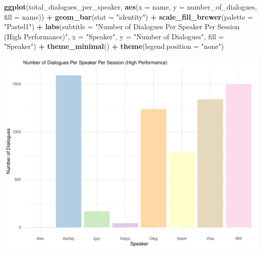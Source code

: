 \documentclass[
]{article}
\newenvironment{Shaded}{\begin{snugshade}}{\end{snugshade}}
\newcommand{\AttributeTok}[1]{\textcolor[rgb]{0.13,0.29,0.53}{#1}}
\newcommand{\FunctionTok}[1]{\textcolor[rgb]{0.13,0.29,0.53}{\textbf{#1}}}
\newcommand{\NormalTok}[1]{#1}
\newcommand{\SpecialCharTok}[1]{\textcolor[rgb]{0.81,0.36,0.00}{\textbf{#1}}}
\newcommand{\StringTok}[1]{\textcolor[rgb]{0.31,0.60,0.02}{#1}}
\begin{document}
\begin{Shaded}
\begin{Highlighting}[]
\FunctionTok{ggplot}\NormalTok{(total\_dialogues\_per\_speaker, }\FunctionTok{aes}\NormalTok{(}\AttributeTok{x =}\NormalTok{ name, }\AttributeTok{y =}\NormalTok{ number\_of\_dialogues, }\AttributeTok{fill =}\NormalTok{ name)) }\SpecialCharTok{+} 
  \FunctionTok{geom\_bar}\NormalTok{(}\AttributeTok{stat =} \StringTok{"identity"}\NormalTok{) }\SpecialCharTok{+}
  \FunctionTok{scale\_fill\_brewer}\NormalTok{(}\AttributeTok{palette =} \StringTok{"Pastel1"}\NormalTok{) }\SpecialCharTok{+}  
  \FunctionTok{labs}\NormalTok{(}\AttributeTok{subtitle =} \StringTok{"Number of Dialogues Per Speaker Per Session (High Performance)"}\NormalTok{,}
       \AttributeTok{x =} \StringTok{"Speaker"}\NormalTok{,}
       \AttributeTok{y =} \StringTok{"Number of Dialogues"}\NormalTok{,}
       \AttributeTok{fill =} \StringTok{"Speaker"}\NormalTok{) }\SpecialCharTok{+}
  \FunctionTok{theme\_minimal}\NormalTok{() }\SpecialCharTok{+} 
  \FunctionTok{theme}\NormalTok{(}\AttributeTok{legend.position =} \StringTok{"none"}\NormalTok{) }
\end{Highlighting}
\end{Shaded}

\begin{center}\includegraphics{low_surv_analysis_files/figure-latex/unnamed-chunk-6-1} \end{center}
\end{document}
